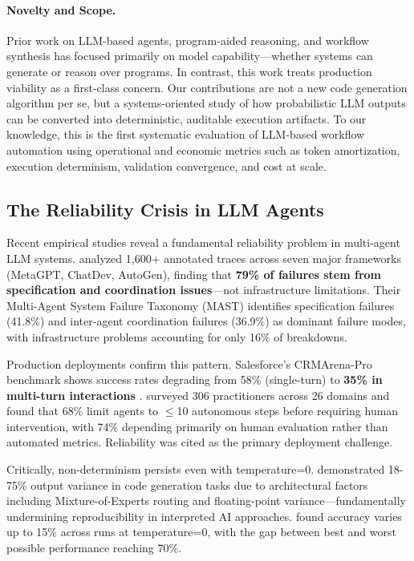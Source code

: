 \documentclass[11pt]{article}
\begin{document}
\paragraph{Novelty and Scope.}
Prior work on LLM-based agents, program-aided reasoning, and workflow synthesis has focused primarily on model capability—whether systems can generate or reason over programs. In contrast, this work treats production viability as a first-class concern. Our contributions are not a new code generation algorithm per se, but a systems-oriented study of how probabilistic LLM outputs can be converted into deterministic, auditable execution artifacts. To our knowledge, this is the first systematic evaluation of LLM-based workflow automation using operational and economic metrics such as token amortization, execution determinism, validation convergence, and cost at scale.

\subsection{The Reliability Crisis in LLM Agents}

Recent empirical studies reveal a fundamental reliability problem in multi-agent LLM systems. \citet{cemri2025multiagent} analyzed 1,600+ annotated traces across seven major frameworks (MetaGPT, ChatDev, AutoGen), finding that \textbf{79\% of failures stem from specification and coordination issues}—not infrastructure limitations. Their Multi-Agent System Failure Taxonomy (MAST) identifies specification failures (41.8\%) and inter-agent coordination failures (36.9\%) as dominant failure modes, with infrastructure problems accounting for only 16\% of breakdowns.

Production deployments confirm this pattern. Salesforce's CRMArena-Pro benchmark shows success rates degrading from 58\% (single-turn) to \textbf{35\% in multi-turn interactions} \citep{salesforce2025agents}. \citet{pan2025measuring} surveyed 306 practitioners across 26 domains and found that 68\% limit agents to $\leq$10 autonomous steps before requiring human intervention, with 74\% depending primarily on human evaluation rather than automated metrics. Reliability was cited as the primary deployment challenge.

Critically, non-determinism persists even with temperature=0. \citet{ouyang2023nondeterminism} demonstrated 18-75\% output variance in code generation tasks due to architectural factors including Mixture-of-Experts routing and floating-point variance—fundamentally undermining reproducibility in interpreted AI approaches. \citet{atil2024nondeterminism} found accuracy varies up to 15\% across runs at temperature=0, with the gap between best and worst possible performance reaching 70\%.
\end{document}
